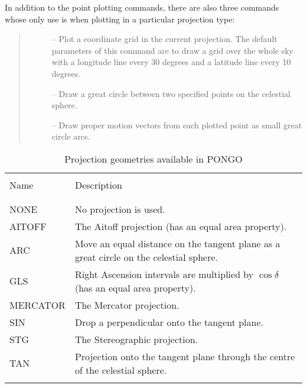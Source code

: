 In addition to the point plotting commands, there are also three commands whose
only use is when plotting in a particular projection type:

\begin {quote}
\begin{description}
\item [] -- Plot a coordinate grid in the current projection.
                       The default parameters of this command are to draw a
                       grid over the whole sky with a longitude line every 30
                       degrees and a latitude line every 10 degrees.
\item [] -- Draw a great circle between two specified points
                             on the celestial sphere.
\item [] -- Draw proper motion vectors from each plotted point as
                        small great circle arcs.
\end{description}
\end {quote}

\begin{table}[t]
\centering
\begin{tabular}{|l|p{}|} \hline
& \\
Name     & Description \\
& \\ \hline
& \\
NONE     & No projection is used. \\
AITOFF   & The Aitoff projection (has an equal area property). \\
ARC      & Move an equal distance on the tangent plane as a great circle on the
celestial sphere. \\
GLS      & Right Ascension intervals are multiplied by $\cos\delta$ (has an
equal area property). \\
MERCATOR & The Mercator projection. \\
SIN      & Drop a perpendicular onto the tangent plane. \\
STG      & The Stereographic projection. \\
TAN      & Projection onto the tangent plane through the centre of the
celestial sphere. \\
& \\ \hline
\end{tabular}
\caption{Projection geometries available in PONGO} \label{proj_tab}
\end{table}


